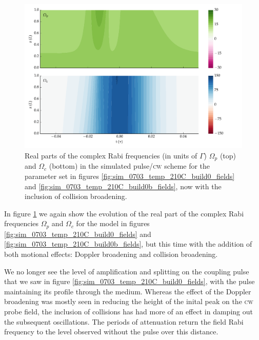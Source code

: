     \begin{figure}[h]
      \includegraphics[width=\linewidth]{figs/06_simultons/mb_vee2g_build1_15c_130p_0330t_230C_sb50_120vel000_00_002um_fig2.pdf}
      \caption{
      Real parts of the complex Rabi frequencies (in units of $\Gamma$)
      $\Omega_{p}$ (top) and  $\Omega_{c}$ (bottom) in the simulated
      pulse/\textsc{cw} scheme for the parameter set in figures
      \ref{fig:sim_0703_temp_210C_build0_fields} and
      \ref{fig:sim_0703_temp_210C_build0b_fields}, now with the inclusion of
      collision broadening.
      }
      \label{fig:sim_0703_temp_210C_build2_fields}
    \end{figure}

    In figure \ref{fig:sim_0703_temp_210C_build2_fields} we again show the
    evolution of the real part of the complex Rabi frequencies $\Omega_p$ and
    $\Omega_c$ for the model in figures
    \ref{fig:sim_0703_temp_210C_build0_fields} and
    \ref{fig:sim_0703_temp_210C_build0b_fields}, but this time with the addition
    of both motional effects: Doppler broadening and collision broadening.

    We no longer see the level of amplification and splitting on the coupling
    pulse that we saw in figure \ref{fig:sim_0703_temp_210C_build0_fields}, with
    the pulse maintaining its profile through the medium. Whereas the effect of
    the Doppler broadening was mostly seen in reducing the height of the inital
    peak on the \textsc{cw} probe field, the inclusion of collisions has had
    more of an effect in damping out the subsequent oscillations. The periods of
    attenuation return the field Rabi frequency to the level observed without
    the pulse over this distance.

